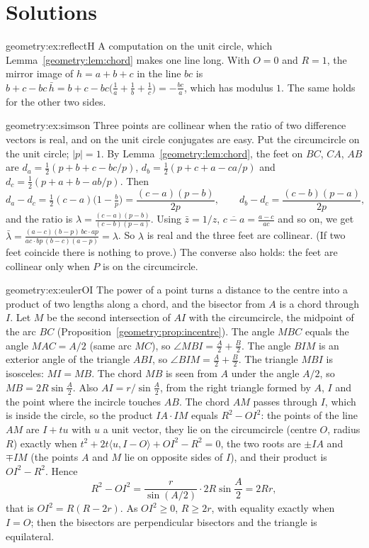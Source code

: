 \section{Solutions}

\begin{solution}{geometry:ex:reflectH}
\idea A computation on the unit circle, which Lemma~\ref{geometry:lem:chord} makes one line long.
\writeup With $O=0$ and $R=1$, the mirror image of $h=a+b+c$ in the line $bc$ is $b+c-bc\,\bar h=b+c-bc\bigl(\frac1a+\frac1b+\frac1c\bigr)=-\frac{bc}a$,
which has modulus $1$. The same holds for the other two sides.
\end{solution}

\begin{solution}{geometry:ex:simson}
\idea Three points are collinear when the ratio of two difference vectors is real, and on the unit circle conjugates are easy.
\writeup Put the circumcircle on the unit circle; $|p|=1$. By Lemma~\ref{geometry:lem:chord}, the feet on $BC$, $CA$, $AB$ are
$d_a=\frac12(p+b+c-bc/p)$, $d_b=\frac12(p+c+a-ca/p)$ and $d_c=\frac12(p+a+b-ab/p)$. Then
\[
d_a-d_c=\tfrac12(c-a)\bigl(1-\tfrac bp\bigr)=\frac{(c-a)(p-b)}{2p},\qquad d_b-d_c=\frac{(c-b)(p-a)}{2p},
\]
and the ratio is $\lambda=\frac{(c-a)(p-b)}{(c-b)(p-a)}$. Using $\bar z=1/z$, $\overline{c-a}=\frac{a-c}{ac}$ and so on, we get
$\bar\lambda=\frac{(a-c)(b-p)\,bc\cdot ap}{ac\cdot bp\,(b-c)(a-p)}=\lambda$. So $\lambda$ is real and the three feet are collinear. (If two feet coincide
there is nothing to prove.) The converse also holds: the feet are collinear only when $P$ is on the circumcircle.
\end{solution}

\begin{solution}{geometry:ex:eulerOI}
\idea The power of a point turns a distance to the centre into a product of two lengths along a chord, and the bisector from $A$ is a
chord through $I$.
\writeup Let $M$ be the second intersection of $AI$ with the circumcircle, the midpoint of the arc $BC$ (Proposition~\ref{geometry:prop:incentre}).
The angle $MBC$ equals the angle $MAC=A/2$ (same arc $MC$), so $\angle MBI=\frac A2+\frac B2$. The angle $BIM$ is an exterior angle of the
triangle $ABI$, so $\angle BIM=\frac A2+\frac B2$. The triangle $MBI$ is isosceles: $MI=MB$. The chord $MB$ is seen from $A$ under the
angle $A/2$, so $MB=2R\sin\frac A2$. Also $AI=r/\sin\frac A2$, from the right triangle formed by $A$, $I$ and the point where the incircle
touches $AB$. The chord $AM$ passes through $I$, which is inside the circle, so the product $IA\cdot IM$ equals $R^2-OI^2$: the points of the line
$AM$ are $I+tu$ with $u$ a unit vector, they lie on the circumcircle (centre $O$, radius $R$) exactly when $t^2+2t\langle u,I-O\rangle+OI^2-R^2=0$,
the two roots are $\pm IA$ and $\mp IM$ (the points $A$ and $M$ lie on opposite sides of $I$), and their product is $OI^2-R^2$. Hence
\[
R^2-OI^2=\frac r{\sin(A/2)}\cdot2R\sin\frac A2=2Rr,
\]
that is $OI^2=R(R-2r)$. As $OI^2\ge0$, $R\ge2r$, with equality exactly when $I=O$; then the bisectors are perpendicular bisectors and
the triangle is equilateral.
\end{solution}

